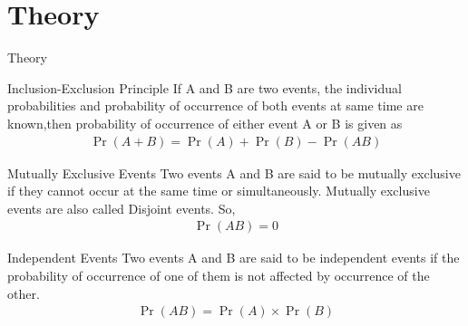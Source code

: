 \documentclass{beamer}
\providecommand{\pr}[1]{\ensuremath{\Pr\left(#1\right)}}
\begin{document}
\section{Theory}
	\begin{frame}{Theory}
			 \begin{block}{Inclusion-Exclusion Principle}
			    If A and B are two events, the individual probabilities and probability of occurrence of both events at same time are known,then probability of occurrence of either event A or B is given as
			    \begin{align}
				    \pr{A+B} = \pr{A} + \pr{B} - \pr{AB}
				\end{align}	
			\end{block}
			
			\begin{block}{Mutually Exclusive Events}
			   Two events A and B are said to be mutually exclusive if they cannot occur at the same time or simultaneously. Mutually exclusive events are also called Disjoint events. So,
			    \begin{align}
				    \pr{AB} = 0
			    \end{align}
		    \end{block}	
		    
	\end{frame}
	
	\begin{frame}	     
		    \begin{block}{Independent Events}
			   Two events A and B are said to be independent events if the probability of occurrence of one of them is not affected by occurrence of the other.
			   \begin{align}
				   \pr{AB}=\pr{A} \times \pr{B}
			   \end{align}
		    \end{block}  
		
	\end{frame}
	
	
\end{document}
